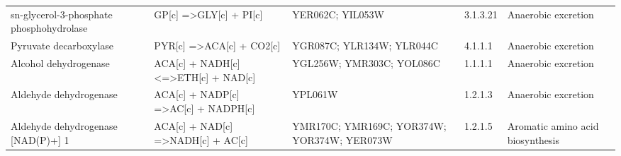 {\begin{landscape}
\begin{longtable}{p{.25\linewidth} | p{.40\linewidth} | p{.19\linewidth} | p{.05\linewidth} | p{.10\linewidth}}
sn-glycerol-3-phosphate phosphohydrolase                                                  & GP{[}c{]} =\textgreater GLY{[}c{]} + PI{[}c{]}                                                                                                  & YER062C; YIL053W                                                                                                                                                 & 3.1.3.21           & Anaerobic excretion                                                         \\
Pyruvate decarboxylase                                                                    & PYR{[}c{]} =\textgreater ACA{[}c{]} + CO2{[}c{]}                                                                                                & YGR087C; YLR134W; YLR044C                                                                                                                                        & 4.1.1.1            & Anaerobic excretion                                                         \\
Alcohol dehydrogenase                                                                     & ACA{[}c{]} + NADH{[}c{]} \textless{}=\textgreater ETH{[}c{]} + NAD{[}c{]}                                                                       & YGL256W; YMR303C; YOL086C                                                                                                                                        & 1.1.1.1            & Anaerobic excretion                                                         \\
Aldehyde dehydrogenase                                                                    & ACA{[}c{]} + NADP{[}c{]} =\textgreater AC{[}c{]} + NADPH{[}c{]}                                                                                 & YPL061W                                                                                                                                                          & 1.2.1.3            & Anaerobic excretion                                                         \\
Aldehyde dehydrogenase {[}NAD(P)+{]} 1                                                    & ACA{[}c{]} + NAD{[}c{]} =\textgreater NADH{[}c{]} + AC{[}c{]}                                                                                   & YMR170C; YMR169C; YOR374W; YOR374W; YER073W                                                                                                                      & 1.2.1.5            & Aromatic amino acid biosynthesis \\

\end{longtable}
\end{landscape}}
